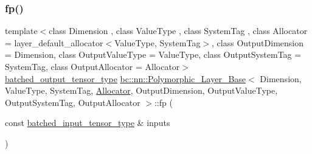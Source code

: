 \subsubsection{\texorpdfstring{fp()}{fp()}\hspace{0.1cm}{\footnotesize\ttfamily [1/2]}}
{\footnotesize\ttfamily template$<$class Dimension , class Value\+Type , class System\+Tag , class Allocator  = layer\+\_\+default\+\_\+allocator$<$\+Value\+Type, System\+Tag$>$, class Output\+Dimension  = Dimension, class Output\+Value\+Type  = Value\+Type, class Output\+System\+Tag  = System\+Tag, class Output\+Allocator  = Allocator$>$ \\
\hyperlink{structbc_1_1nn_1_1Polymorphic__Layer__Base_a45ed57549be9c4e5c40c52168ca15ae9}{batched\+\_\+output\+\_\+tensor\+\_\+type} \hyperlink{structbc_1_1nn_1_1Polymorphic__Layer__Base}{bc\+::nn\+::\+Polymorphic\+\_\+\+Layer\+\_\+\+Base}$<$ Dimension, Value\+Type, System\+Tag, \hyperlink{classbc_1_1allocators_1_1Allocator}{Allocator}, Output\+Dimension, Output\+Value\+Type, Output\+System\+Tag, Output\+Allocator $>$\+::fp (\begin{DoxyParamCaption}\item[{const \hyperlink{structbc_1_1nn_1_1Polymorphic__Layer__Base_ae694b03dd73923ff973b0d2c9156e161}{batched\+\_\+input\+\_\+tensor\+\_\+type} \&}]{inputs }\end{DoxyParamCaption})\hspace{0.3cm}{\ttfamily [inline]}}

\mbox{\label{structbc_1_1nn_1_1Polymorphic__Layer__Base_a71ab20a7baff5faf1c3d5ff16552a983}} 
